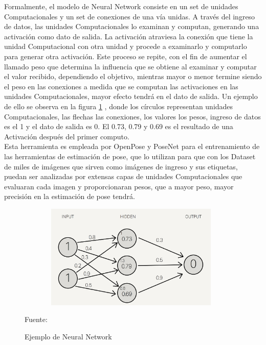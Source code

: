 Formalmente, el modelo de Neural Network consiste en un set de unidades Computacionales y un set de conexiones de una vía unidas. A través del ingreso de datos, las unidades Computacionales lo examinan y computan, generando una activación como dato de salida. La activación atraviesa la conexión que tiene la unidad Computacional con otra unidad y procede a examinarlo y computarlo para generar otra activación. 
Este proceso se repite, con el fin de aumentar el llamado peso que determina la influencia que se obtiene al examinar y computar el valor recibido, dependiendo el objetivo, mientras mayor o menor termine siendo el peso en las conexiones a medida que se computan las activaciones en las unidades Computacionales, mayor efecto tendrá en el dato de salida. 
Un ejemplo de ello se observa en la figura \ref{neuralnetwork} \cite{gallant1993neural}, donde los círculos representan unidades Computacionales, las flechas las conexiones, los valores los pesos, ingreso de datos es el 1 y el dato de salida es 0. El 0.73, 0.79 y 0.69 es el resultado de una Activación después del primer computo.
\\
Esta herramienta es empleada por OpenPose y PoseNet para el entrenamiento de las herramientas de estimación de pose, que lo utilizan para que con los Dataset de miles de imágenes que sirven como imágenes de ingreso y sus etiquetas, puedan ser analizadas por extensas capas de unidades Computacionales que evaluaran cada imagen y proporcionaran pesos, que a mayor peso, mayor precisión en la estimación de pose tendrá.
\begin{figure}[t!]
	\centering
	\includegraphics[width=11cm,height=5cm,]{./Images/neuralnetwork.png}
	\caption{Ejemplo de Neural Network}
	\footnotesize Fuente:\cite{8765346}
	\label{neuralnetwork}
\end{figure}